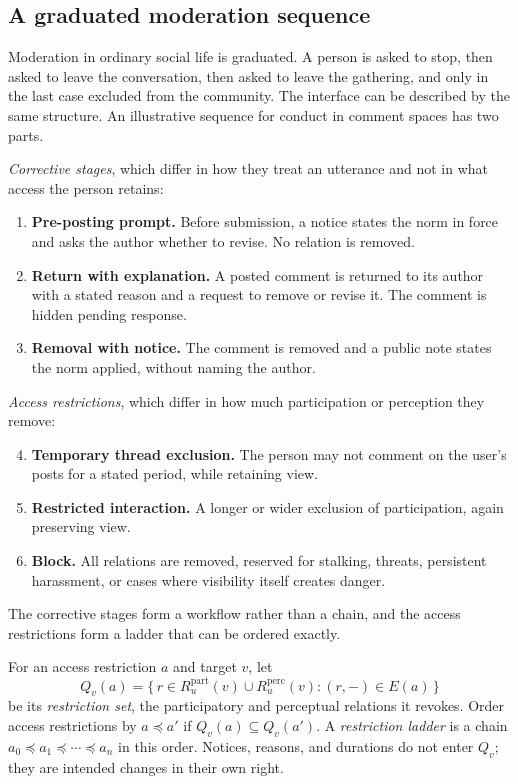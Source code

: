 \subsection{A graduated moderation sequence}

Moderation in ordinary social life is graduated. A person is asked to stop, then asked to leave the conversation, then asked to leave the gathering, and only in the last case excluded from the community. The interface can be described by the same structure. An illustrative sequence for conduct in comment spaces has two parts.

\emph{Corrective stages}, which differ in how they treat an utterance and not in what access the person retains:
\begin{enumerate}
  \item \textbf{Pre-posting prompt.} Before submission, a notice states the norm in force and asks the author whether to revise. No relation is removed.
  \item \textbf{Return with explanation.} A posted comment is returned to its author with a stated reason and a request to remove or revise it. The comment is hidden pending response.
  \item \textbf{Removal with notice.} The comment is removed and a public note states the norm applied, without naming the author.
\end{enumerate}

\emph{Access restrictions}, which differ in how much participation or perception they remove:
\begin{enumerate}
  \setcounter{enumi}{3}
  \item \textbf{Temporary thread exclusion.} The person may not comment on the user's posts for a stated period, while retaining view.
  \item \textbf{Restricted interaction.} A longer or wider exclusion of participation, again preserving view.
  \item \textbf{Block.} All relations are removed, reserved for stalking, threats, persistent harassment, or cases where visibility itself creates danger.
\end{enumerate}

The corrective stages form a workflow rather than a chain, and the access restrictions form a ladder that can be ordered exactly.

\begin{definition}
For an access restriction $a$ and target $v$, let
\[
Q_v(a)=\{\,r\in R_u^{\mathrm{part}}(v)\cup R_u^{\mathrm{perc}}(v) : (r,-)\in E(a)\,\}
\]
be its \emph{restriction set}, the participatory and perceptual relations it revokes. Order access restrictions by $a\preceq a'$ if $Q_v(a)\subseteq Q_v(a')$. A \emph{restriction ladder} is a chain $a_0\preceq a_1\preceq\cdots\preceq a_n$ in this order. Notices, reasons, and durations do not enter $Q_v$; they are intended changes in their own right.
\end{definition}

